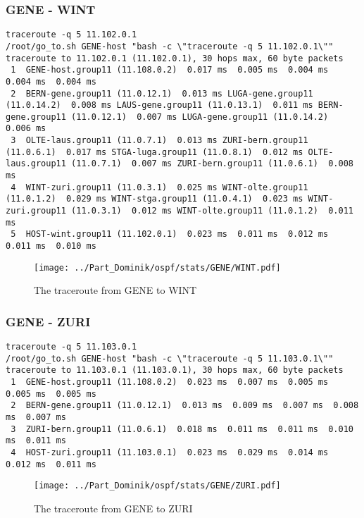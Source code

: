 \subsubsection{GENE - WINT}
\begin{lstlisting}
traceroute -q 5 11.102.0.1
/root/go_to.sh GENE-host "bash -c \"traceroute -q 5 11.102.0.1\""
traceroute to 11.102.0.1 (11.102.0.1), 30 hops max, 60 byte packets
 1  GENE-host.group11 (11.108.0.2)  0.017 ms  0.005 ms  0.004 ms  0.004 ms  0.004 ms
 2  BERN-gene.group11 (11.0.12.1)  0.013 ms LUGA-gene.group11 (11.0.14.2)  0.008 ms LAUS-gene.group11 (11.0.13.1)  0.011 ms BERN-gene.group11 (11.0.12.1)  0.007 ms LUGA-gene.group11 (11.0.14.2)  0.006 ms
 3  OLTE-laus.group11 (11.0.7.1)  0.013 ms ZURI-bern.group11 (11.0.6.1)  0.017 ms STGA-luga.group11 (11.0.8.1)  0.012 ms OLTE-laus.group11 (11.0.7.1)  0.007 ms ZURI-bern.group11 (11.0.6.1)  0.008 ms
 4  WINT-zuri.group11 (11.0.3.1)  0.025 ms WINT-olte.group11 (11.0.1.2)  0.029 ms WINT-stga.group11 (11.0.4.1)  0.023 ms WINT-zuri.group11 (11.0.3.1)  0.012 ms WINT-olte.group11 (11.0.1.2)  0.011 ms
 5  HOST-wint.group11 (11.102.0.1)  0.023 ms  0.011 ms  0.012 ms  0.011 ms  0.010 ms
\end{lstlisting}
\begin{figure}[H]
\centering
\texttt{[image: ../Part\_Dominik/ospf/stats/GENE/WINT.pdf]}
\caption{The traceroute from GENE to WINT}
\end{figure}
\clearpage
\subsubsection{GENE - ZURI}
\begin{lstlisting}
traceroute -q 5 11.103.0.1
/root/go_to.sh GENE-host "bash -c \"traceroute -q 5 11.103.0.1\""
traceroute to 11.103.0.1 (11.103.0.1), 30 hops max, 60 byte packets
 1  GENE-host.group11 (11.108.0.2)  0.023 ms  0.007 ms  0.005 ms  0.005 ms  0.005 ms
 2  BERN-gene.group11 (11.0.12.1)  0.013 ms  0.009 ms  0.007 ms  0.008 ms  0.007 ms
 3  ZURI-bern.group11 (11.0.6.1)  0.018 ms  0.011 ms  0.011 ms  0.010 ms  0.011 ms
 4  HOST-zuri.group11 (11.103.0.1)  0.023 ms  0.029 ms  0.014 ms  0.012 ms  0.011 ms
\end{lstlisting}
\begin{figure}[H]
\centering
\texttt{[image: ../Part\_Dominik/ospf/stats/GENE/ZURI.pdf]}
\caption{The traceroute from GENE to ZURI}
\end{figure}
\clearpage
